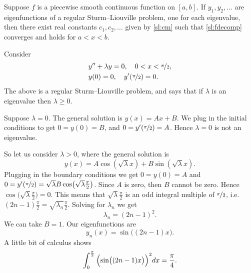\documentclass{ximera}
\begin{document}
\begin{theorem}
    Suppose $f$ is a piecewise smooth continuous function on $[a,b]$.  If $y_1, y_2, \ldots$ are eigenfunctions of a regular Sturm--Liouville problem, one for each eigenvalue, then there exist real constants $c_1, c_2, \ldots$ given by \eqref{sl:cm} such that \eqref{sl:fdecomp} converges and holds for $a < x < b$.
\end{theorem}

\begin{example}
    Consider
    \begin{align*}
        & y'' + \lambda y = 0, \quad 0 < x < \nicefrac{\pi}{2} , \\
        & y(0) =0, \quad y'(\nicefrac{\pi}{2}) = 0 .
    \end{align*}
    The above is a regular Sturm--Liouville problem, and  says that if $\lambda$ is an eigenvalue then $\lambda \geq 0$.
    
    Suppose $\lambda = 0$.  The general solution is $y(x) = Ax + B$. We plug in the initial conditions to get $0=y(0) = B$, and $0 = y'(\nicefrac{\pi}{2}) = A$. Hence $\lambda = 0$ is not an eigenvalue.
    
    So let us consider $\lambda > 0$, where the general solution is
    \begin{equation*}
        y(x) = A \cos ( \sqrt{\lambda}  x ) + B \sin ( \sqrt{\lambda}  x) .
    \end{equation*}
    Plugging in the boundary conditions we get $0 = y(0) = A$ and 
    $0 = y'(\nicefrac{\pi}{2}) = \sqrt{\lambda}  B \cos \bigl(\sqrt{\lambda}  \frac{\pi}{2}\bigr)$. 
    Since $A$ is zero, then $B$ cannot be zero.  Hence $\cos \bigl( \sqrt{\lambda}  \frac{\pi}{2}\bigr) = 0$. This means that $\sqrt{\lambda} \frac{\pi}{2}$ is an odd integral multiple of 
    $\nicefrac{\pi}{2}$, i.e.\ $(2n-1)\frac{\pi}{2} = \sqrt{\lambda_n} \frac{\pi}{2}$. 
    Solving for $\lambda_n$ we get
    \begin{equation*}
        \lambda_n = {(2n-1)}^2 .
    \end{equation*}
    We can take $B = 1$.  Our eigenfunctions are
    \begin{equation*}
        y_n(x) = \sin \bigl( (2n-1)x \bigr) .
    \end{equation*}
    A little bit of calculus shows
    \begin{equation*}
        \int_0^{\frac{\pi}{2}} {\Bigl( \sin \bigl( (2n-1)x \bigr) \Bigr)}^2  dx = \frac{\pi}{4} .
    \end{equation*}
    

\end{example}
\end{document}
